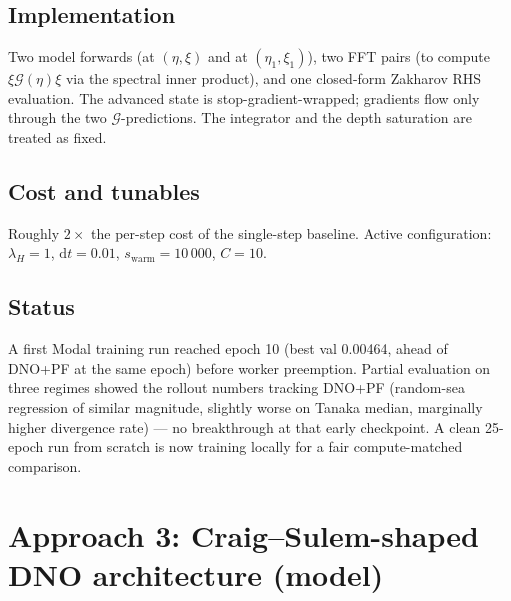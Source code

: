 \documentclass[11pt,letterpaper]{article}
\newcommand{\Gop}{\mathcal{G}}
\begin{document}
\subsection{Implementation}
Two model forwards (at $(\eta,\xi)$ and at $(\eta_{1},\xi_{1})$), two FFT
pairs (to compute $\xi\Gop(\eta)\xi$ via the spectral inner product),
and one closed-form Zakharov RHS evaluation. The advanced state is
stop-gradient-wrapped; gradients flow only through the two
$\Gop$-predictions. The integrator and the depth saturation are treated
as fixed.

\subsection{Cost and tunables}
Roughly $2\times$ the per-step cost of the single-step baseline. Active
configuration: $\lambda_{H}=1$, $\mathrm{d}t=0.01$,
$s_{\mathrm{warm}}=10\,000$, $C=10$.

\subsection{Status}
A first Modal training run reached epoch 10 (best val 0.00464, ahead
of DNO+PF at the same epoch) before worker preemption. Partial
evaluation on three regimes showed the rollout numbers tracking
DNO+PF (random-sea regression of similar magnitude, slightly worse on
Tanaka median, marginally higher divergence rate) --- no breakthrough
at that early checkpoint. A clean 25-epoch run from scratch is now
training locally for a fair compute-matched comparison.

\section{Approach 3: Craig--Sulem-shaped DNO architecture (model)}
\end{document}
